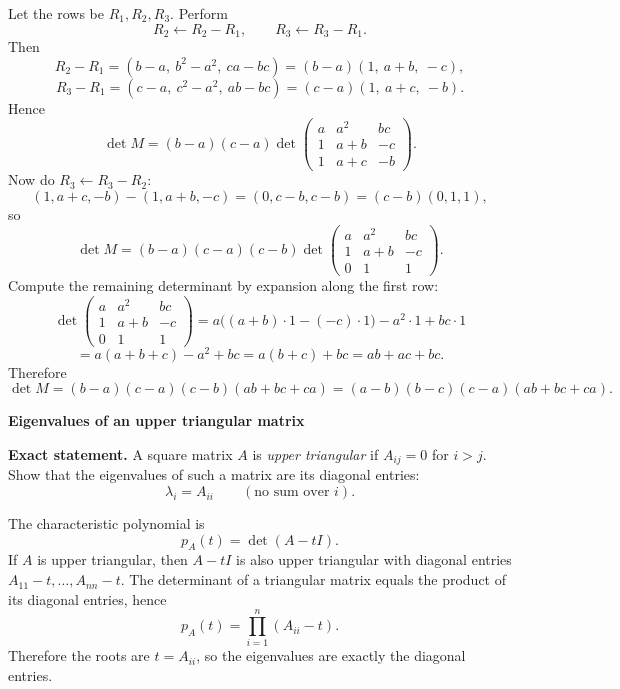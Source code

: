 \begin{solution}
Let the rows be \(R_1,R_2,R_3\). Perform
\[
R_2\leftarrow R_2-R_1,\qquad R_3\leftarrow R_3-R_1.
\]
Then
\[
R_2-R_1=(b-a,\ b^2-a^2,\ ca-bc)=(b-a)(1,\ a+b,\ -c),
\]
\[
R_3-R_1=(c-a,\ c^2-a^2,\ ab-bc)=(c-a)(1,\ a+c,\ -b).
\]
Hence
\[
\det M=(b-a)(c-a)\det\begin{pmatrix}
	a & a^2 & bc\\
	1 & a+b & -c\\
	1 & a+c & -b
\end{pmatrix}.
\]
Now do \(R_3\leftarrow R_3-R_2\):
\[
(1,a+c,-b)-(1,a+b,-c)=(0,c-b,c-b)=(c-b)(0,1,1),
\]
so
\[
\det M=(b-a)(c-a)(c-b)\det\begin{pmatrix}
	a & a^2 & bc\\
	1 & a+b & -c\\
	0 & 1 & 1
\end{pmatrix}.
\]
Compute the remaining determinant by expansion along the first row:
\[
\det\begin{pmatrix}
	a & a^2 & bc\\
	1 & a+b & -c\\
	0 & 1 & 1
\end{pmatrix}
=
a\bigl((a+b)\cdot 1-(-c)\cdot 1\bigr)-a^2\cdot 1+bc\cdot 1
\]
\[
=a(a+b+c)-a^2+bc=a(b+c)+bc=ab+ac+bc.
\]
Therefore
\[
\det M=(b-a)(c-a)(c-b)(ab+bc+ca)=(a-b)(b-c)(c-a)(ab+bc+ca).
\]
\end{solution}

\begin{problem}[CP-I-0022]
\label{prob:cp-i-0022}
\textbf{Eigenvalues of an upper triangular matrix}

\textbf{Exact statement.}
\hspace*{1.5em}A square matrix $A$ is \emph{upper triangular} if $A_{ij}=0$ for $i>j$.
Show that the eigenvalues of such a matrix are its diagonal entries:
\[
\lambda_i=A_{ii}\qquad(\text{no sum over }i).
\]

\end{problem}

\begin{solution}
The characteristic polynomial is
\[
p_A(t)=\det(A-tI).
\]
If $A$ is upper triangular, then $A-tI$ is also upper triangular with diagonal entries
$A_{11}-t,\dots,A_{nn}-t$. The determinant of a triangular matrix equals the product
of its diagonal entries, hence
\[
p_A(t)=\prod_{i=1}^n (A_{ii}-t).
\]
Therefore the roots are $t=A_{ii}$, so the eigenvalues are exactly the diagonal entries.
\end{solution}

